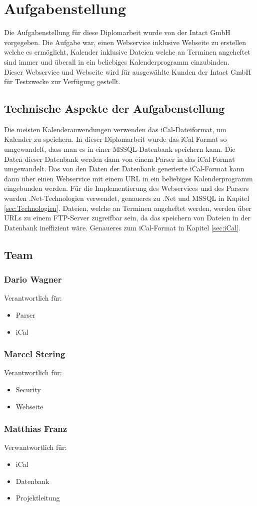 \chapter{Aufgabenstellung}
\label{sec:Aufgabenstellung}
Die Aufgabenstellung für diese Diplomarbeit wurde von der Intact GmbH vorgegeben. Die Aufgabe war, einen Webservice inklusive Webseite zu erstellen welche es ermöglicht, Kalender inklusive Dateien welche an Terminen angeheftet sind immer und überall in ein beliebiges Kalenderprogramm einzubinden. \\
Dieser Webservice und Webseite wird für ausgewählte Kunden der Intact GmbH für Testzwecke zur Verfügung gestellt. \\

\section{Technische Aspekte der Aufgabenstellung}
\label{sec:TechnischeAspekteDerAufgabenstellung}
Die meisten Kalenderanwendungen verwenden das iCal-Dateiformat, um Kalender zu speichern. In dieser Diplomarbeit wurde das iCal-Format so umgewandelt, dass man es in einer MSSQL-Datenbank speichern kann. Die Daten dieser Datenbank werden dann von einem Parser in das iCal-Format umgewandelt. Das von den Daten der Datenbank generierte iCal-Format kann dann über einen Webservice mit einem URL in ein beliebiges Kalenderprogramm eingebunden werden. Für die Implementierung des Webservices und des Parsers wurden .Net-Technologien verwendet, genaueres zu .Net und MSSQL in Kapitel \ref{sec:Technologien}.  Dateien, welche an Terminen angeheftet werden, werden über URLs zu einem FTP-Server zugreifbar sein, da das speichern von Dateien in der Datenbank ineffizient wäre. Genaueres zum iCal-Format in Kapitel \ref{sec:iCal}.
\pagebreak

\section{Team}
\label{sec:Team}
	\subsection*{Dario Wagner}
		Verantwortlich für: 
		\begin{itemize}
			\item Parser
			\item iCal
		\end{itemize}
	\subsection*{Marcel Stering}
		Verantwortlich für: 
		\begin{itemize}
			\item Security
			\item Webseite
		\end{itemize}
	\subsection*{Matthias Franz}
		Verwantwortlich für: 
		\begin{itemize}
			\item iCal
			\item Datenbank
			\item Projektleitung
		\end{itemize}	
\pagebreak			